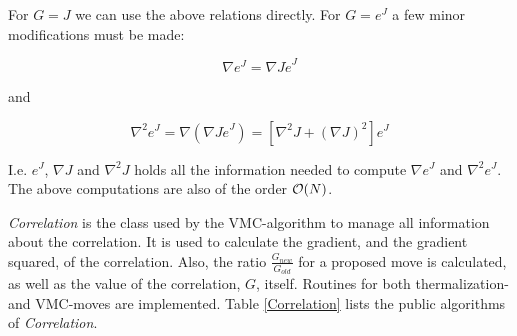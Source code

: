 For $G=J$ we can use the above relations directly. For $G=e^J$ a few
minor modifications must be made:

\begin{equation}
  \nabla e^J = \nabla J \dot e^J
\end{equation}

and

\begin{equation}
  \nabla^2 e^J = \nabla (\nabla J \dot e^J) = \left[ \nabla^2 J +
  (\nabla J)^2  \right] e^J
\end{equation}

I.e. $e^J$, $\nabla J$ and $\nabla^2 J$ holds all the information needed to
compute $\nabla e^J$ and $\nabla^2 e^J$. The above computations are
also of the order ${\cal O}(N)$. \newline


\emph{Correlation} is the class used by the VMC-algorithm to manage
all information 
about the correlation. It is used to calculate the gradient, and the
gradient squared, of the correlation. Also, the ratio
$\frac{G_{new}}{G_{old}}$ for a proposed move is calculated, as well
as the value of the correlation, $G$, itself. Routines for both
thermalization- and VMC-moves are implemented. \newline
Table \ref{Correlation} lists the public algorithms of \emph{Correlation}.

